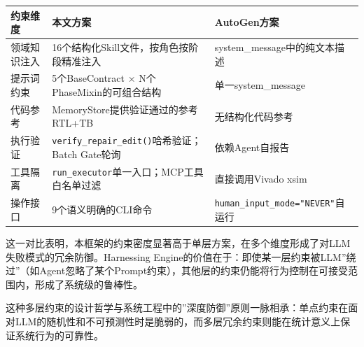 {\def\LTcaptype{none} %
\begin{longtable}[]{@{}
  >{\raggedright\arraybackslash}p{}
  >{\raggedright\arraybackslash}p{}
  >{\raggedright\arraybackslash}p{}@{}}
\toprule\noalign{}
\begin{minipage}[b]{\linewidth}\raggedright
约束维度
\end{minipage} & \begin{minipage}[b]{\linewidth}\raggedright
本文方案
\end{minipage} & \begin{minipage}[b]{\linewidth}\raggedright
AutoGen方案
\end{minipage} \\
\midrule\noalign{}
\endhead
\bottomrule\noalign{}
\endlastfoot
领域知识注入 & 16个结构化Skill文件，按角色按阶段精准注入 &
system\_message中的纯文本描述 \\
提示词约束 & 5个BaseContract × N个PhaseMixin的可组合结构 &
单一system\_message \\
代码参考 & MemoryStore提供验证通过的参考RTL+TB & 无结构化代码参考 \\
执行验证 & \texttt{verify\_repair\_edit()}哈希验证；Batch Gate轮询 &
依赖Agent自报告 \\
工具隔离 & \texttt{run\_executor}单一入口；MCP工具白名单过滤 &
直接调用Vivado xsim \\
操作接口 & 9个语义明确的CLI命令 &
\texttt{human\_input\_mode="NEVER"}自运行 \\
\end{longtable}
}

这一对比表明，本框架的约束密度显著高于单层方案，在多个维度形成了对LLM失败模式的冗余防御。Harnessing
Engine的价值在于：即使某一层约束被LLM''绕过''（如Agent忽略了某个Prompt约束），其他层的约束仍能将行为控制在可接受范围内，形成了系统级的鲁棒性。

这种多层约束的设计哲学与系统工程中的''深度防御''原则一脉相承：单点约束在面对LLM的随机性和不可预测性时是脆弱的，而多层冗余约束则能在统计意义上保证系统行为的可靠性。
